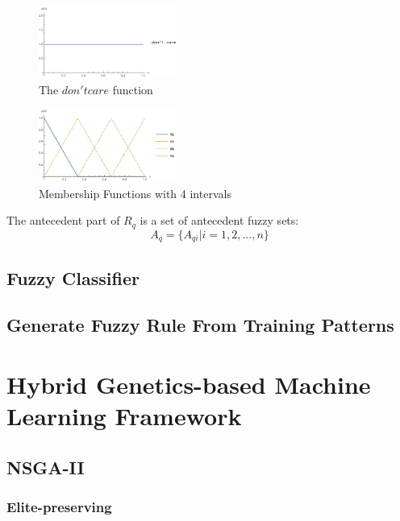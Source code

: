 \documentclass[conference]{IEEEtran}
\begin{document}
  \begin{figure}[H]
 	\centering
 	\includegraphics[width=0.4\textwidth]{figures/u1.png}
   \caption{The $don't care$ function}\label{fig:digit}
   \label{u0}
 \end{figure}
 \begin{figure}[H]
 	\centering
 	\includegraphics[width=0.4\textwidth]{figures/u4.png}
   \caption{Membership Functions with 4 intervals}\label{fig:digit}
   \label{u3}
 \end{figure}
  The antecedent part of $R_q$ is a set of antecedent fuzzy sets:
\begin{equation}A_q = \{A_{qi}|i = 1,2,...,n\}\end{equation}

 
  \subsection{Fuzzy Classifier}
  
  \subsection{Generate Fuzzy Rule From Training Patterns}
  
  \section{Hybrid Genetics-based Machine Learning Framework}
 
	 \subsection{NSGA-II}
	 
	 \subsubsection{Elite-preserving}
	 
\end{document}
